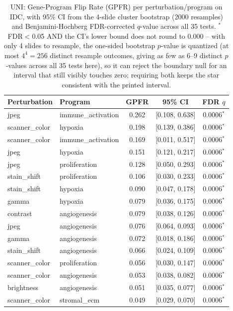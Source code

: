 \begin{table}[t]
\centering
\caption{UNI: Gene-Program Flip Rate (GPFR) per perturbation/program on IDC, with 95\% CI from the 4-slide cluster bootstrap (2000 resamples) and Benjamini-Hochberg FDR-corrected $q$-value across all 35 tests. $^{*}$ FDR$<$0.05 AND the CI's lower bound does not round to 0.000 -- with only 4 slides to resample, the one-sided bootstrap $p$-value is quantized (at most $4^4=256$ distinct resample outcomes, giving as few as 6--9 distinct $p$-values across all 35 tests here), so it can reject the boundary null for an interval that still visibly touches zero; requiring both keeps the star consistent with the printed interval.}
\label{tab:gpfr_uni}
\begin{tabular}{llccc}
\toprule
Perturbation & Program & GPFR & 95\% CI & FDR $q$ \\
\midrule
jpeg & immune\_activation & 0.262 & [0.108, 0.638] & 0.0006$^{*}$ \\
scanner\_color & hypoxia & 0.198 & [0.139, 0.386] & 0.0006$^{*}$ \\
scanner\_color & immune\_activation & 0.169 & [0.011, 0.517] & 0.0006$^{*}$ \\
jpeg & hypoxia & 0.151 & [0.121, 0.217] & 0.0006$^{*}$ \\
jpeg & proliferation & 0.128 & [0.050, 0.293] & 0.0006$^{*}$ \\
stain\_shift & proliferation & 0.106 & [0.030, 0.233] & 0.0006$^{*}$ \\
stain\_shift & hypoxia & 0.090 & [0.047, 0.178] & 0.0006$^{*}$ \\
gamma & hypoxia & 0.079 & [0.036, 0.175] & 0.0006$^{*}$ \\
contrast & angiogenesis & 0.079 & [0.038, 0.126] & 0.0006$^{*}$ \\
jpeg & angiogenesis & 0.076 & [0.064, 0.093] & 0.0006$^{*}$ \\
gamma & angiogenesis & 0.072 & [0.018, 0.186] & 0.0006$^{*}$ \\
stain\_shift & angiogenesis & 0.066 & [0.024, 0.109] & 0.0006$^{*}$ \\
scanner\_color & proliferation & 0.056 & [0.030, 0.147] & 0.0006$^{*}$ \\
scanner\_color & angiogenesis & 0.053 & [0.038, 0.082] & 0.0006$^{*}$ \\
brightness & angiogenesis & 0.051 & [0.035, 0.077] & 0.0006$^{*}$ \\
scanner\_color & stromal\_ecm & 0.049 & [0.029, 0.070] & 0.0006$^{*}$ \\

\end{tabular}
\end{table}
